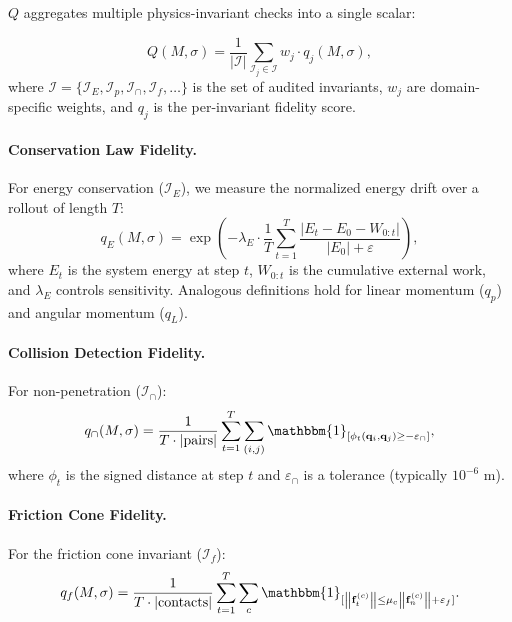 \documentclass[11pt,twocolumn]{article}
\theoremstyle{definition}
\newcommand{\ind}[1]{\mathbbm{1}_{[#1]}}
\newcommand{\norm}[1]{\left\lVert#1\right\rVert}
\begin{document}
$Q$ aggregates multiple physics-invariant checks into a single scalar:

\begin{equation}
  Q(M, \sigma) =
  \frac{1}{|\mathcal{I}|} \sum_{\mathcal{I}_j \in \mathcal{I}}
  w_j \cdot q_j(M, \sigma),
\end{equation}
where $\mathcal{I} = \{\mathcal{I}_E, \mathcal{I}_p, \mathcal{I}_{\cap},
\mathcal{I}_f, \dots\}$ is the set of audited invariants, $w_j$ are
domain-specific weights, and $q_j$ is the per-invariant fidelity score.

\paragraph{Conservation Law Fidelity.}
For energy conservation ($\mathcal{I}_E$), we measure the normalized energy
drift over a rollout of length $T$:
\begin{equation}
  q_E(M, \sigma) =
  \exp\!\left(
    -\lambda_E \cdot \frac{1}{T}\sum_{t=1}^{T}
    \frac{|E_t - E_0 - W_{0:t}|}{|E_0| + \varepsilon}
  \right),
\end{equation}
where $E_t$ is the system energy at step $t$, $W_{0:t}$ is the cumulative
external work, and $\lambda_E$ controls sensitivity.  Analogous definitions
hold for linear momentum ($q_p$) and angular momentum ($q_L$).

\paragraph{Collision Detection Fidelity.}
For non-penetration ($\mathcal{I}_{\cap}$):
\begin{equation}
  q_{\cap}(M, \sigma) =
  \frac{1}{T\cdot |\text{pairs}|}
  \sum_{t=1}^{T} \sum_{(i,j)}
  \ind{\phi_t(\mathbf{q}_i, \mathbf{q}_j) \ge -\varepsilon_{\cap}},
\end{equation}
where $\phi_t$ is the signed distance at step $t$ and $\varepsilon_{\cap}$ is
a tolerance (typically $10^{-6}$ m).

\paragraph{Friction Cone Fidelity.}
For the friction cone invariant ($\mathcal{I}_f$):
\begin{equation}
  q_f(M, \sigma) =
  \frac{1}{T\cdot |\text{contacts}|}
  \sum_{t=1}^{T} \sum_{c}
  \ind{\norm{\mathbf{f}_t^{(c)}} \le \mu_c \norm{\mathbf{f}_n^{(c)}} + \varepsilon_f}.
\end{equation}
\end{document}
